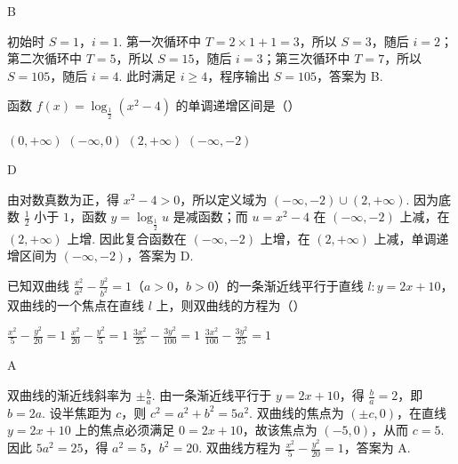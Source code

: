 \begin{answer}
B
\end{answer}

\begin{solution}
初始时 \(S=1\)，\(i=1\). 第一次循环中 \(T=2\times1+1=3\)，所以 \(S=3\)，随后 \(i=2\)；第二次循环中 \(T=5\)，所以 \(S=15\)，随后 \(i=3\)；第三次循环中 \(T=7\)，所以 \(S=105\)，随后 \(i=4\). 此时满足 \(i\geqslant4\)，程序输出 \(S=105\)，答案为 B.
\end{solution}

\begin{problem}
函数 \( f(x) = \log_{\frac{1}{2}}(x^2 - 4) \) 的单调递增区间是（\quad）

\choices
    {\((0, +\infty)\)}
    {\((-\infty, 0)\)}
    {\((2, +\infty)\)}
    {\((-\infty, -2)\)}
\end{problem}

\begin{answer}
D
\end{answer}

\begin{solution}
由对数真数为正，得 \(x^2-4>0\)，所以定义域为 \((-\infty,-2)\cup(2,+\infty)\). 因为底数 \(\frac12\) 小于 \(1\)，函数 \(y=\log_{\frac{1}{2}}u\) 是减函数；而 \(u=x^2-4\) 在 \((-\infty,-2)\) 上减，在 \((2,+\infty)\) 上增. 因此复合函数在 \((-\infty,-2)\) 上增，在 \((2,+\infty)\) 上减，单调递增区间为 \((-\infty,-2)\)，答案为 D.
\end{solution}

\begin{problem}
已知双曲线 \(\frac{x^2}{a^2} - \frac{y^2}{b^2} = 1\)（\(a > 0\)，\(b > 0\)）的一条渐近线平行于直线 \(l: y = 2x + 10\)，双曲线的一个焦点在直线 \(l\) 上，则双曲线的方程为（\quad）

\choices
    {\(\frac{x^2}{5} - \frac{y^2}{20} = 1\)}
    {\(\frac{x^2}{20} - \frac{y^2}{5} = 1\)}
    {\(\frac{3x^2}{25} - \frac{3y^2}{100} = 1\)}
    {\(\frac{3x^2}{100} - \frac{3y^2}{25} = 1\)}
\end{problem}

\begin{answer}
A
\end{answer}

\begin{solution}
双曲线的渐近线斜率为 \(\pm\frac ba\). 由一条渐近线平行于 \(y=2x+10\)，得 \(\frac ba=2\)，即 \(b=2a\). 设半焦距为 \(c\)，则 \(c^2=a^2+b^2=5a^2\). 双曲线的焦点为 \((\pm c,0)\)，在直线 \(y=2x+10\) 上的焦点必须满足 \(0=2x+10\)，故该焦点为 \((-5,0)\)，从而 \(c=5\). 因此 \(5a^2=25\)，得 \(a^2=5\)，\(b^2=20\). 双曲线方程为 \(\frac{x^2}{5}-\frac{y^2}{20}=1\)，答案为 A.
\end{solution}


